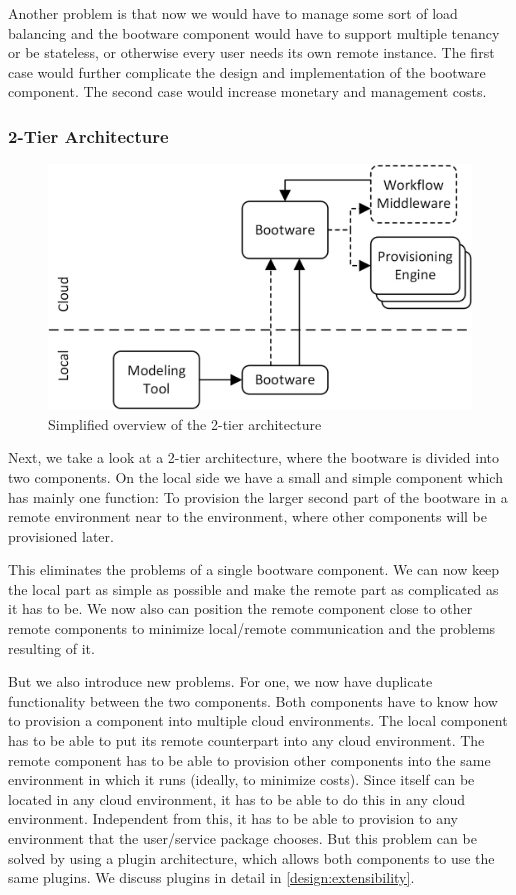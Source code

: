 Another problem is that now we would have to manage some sort of load balancing and the bootware component would have to support multiple tenancy or be stateless, or otherwise every user needs its own remote instance.
The first case would further complicate the design and implementation of the bootware component.
The second case would increase monetary and management costs.

\subsubsection{2-Tier Architecture}
\label{design:division:2tier}

\begin{figure}[!htbp]
	\centering
	\includegraphics[resolution=600]{design/assets/simple_2_tier}
	\caption{Simplified overview of the 2-tier architecture}
	\label{image:single_2_tier}
\end{figure}

Next, we take a look at a 2-tier architecture, where the bootware is divided into two components.
On the local side we have a small and simple component which has mainly one function: To provision the larger second part of the bootware in a remote environment near to the environment, where other components will be provisioned later.

This eliminates the problems of a single bootware component.
We can now keep the local part as simple as possible and make the remote part as complicated as it has to be.
We now also can position the remote component close to other remote components to minimize local/remote communication and the problems resulting of it.

But we also introduce new problems.
For one, we now have duplicate functionality between the two components.
Both components have to know how to provision a component into multiple cloud environments.
The local component has to be able to put its remote counterpart into any cloud environment.
The remote component has to be able to provision other components into the same environment in which it runs (ideally, to minimize costs).
Since itself can be located in any cloud environment, it has to be able to do this in any cloud environment.
Independent from this, it has to be able to provision to any environment that the user/service package chooses.
But this problem can be solved by using a plugin architecture, which allows both components to use the same plugins.
We discuss plugins in detail in \autoref{design:extensibility}.

